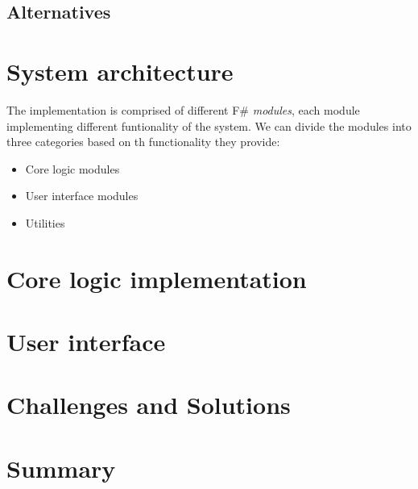 \subsection{Alternatives}

\section{System architecture}
\label{sec:appArch}
The implementation is comprised of different F\# \emph{modules}, each module implementing different funtionality of the system.
We can divide the modules into three categories based on th functionality they provide:
\begin{itemize}
	\item Core logic modules
	\item User interface modules
	\item Utilities
\end{itemize}



\section{Core logic implementation}

\section{User interface}
\label{sec:ui}

\section{Challenges and Solutions}
\section{Summary}
